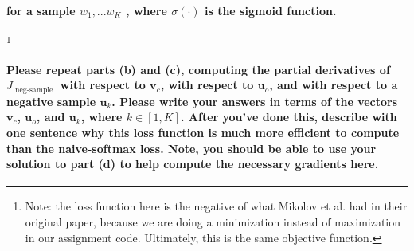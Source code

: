 \documentclass[12pt, letterpaper]{article}
\begin{document}
\paragraph{for a sample $w_1, . . . w_K$ , where $\sigma(\cdot)$ is the sigmoid function.}\footnote{Note: the loss function here is the negative of what Mikolov et al. had in their original paper, because we are doing a minimization instead of maximization in our assignment code. Ultimately, this is the same objective function.}
\paragraph{Please repeat parts (b) and (c), computing the partial derivatives of $J_{\text { neg-sample }}$ with respect to $\boldsymbol{v}_c$, with respect to $\boldsymbol{u}_o$, and with respect to a negative sample $\boldsymbol{u}_k$. Please write your answers in terms of the vectors $\boldsymbol{v}_c$, $\boldsymbol{u}_o$, and $\boldsymbol{u}_k$, where $k \in [1,K]$. After you've done this, describe with one sentence why this loss function is much more efficient to compute than the naive-softmax loss. Note, you should be able to use your solution to part (d) to help compute the necessary gradients here.}
\end{document}
